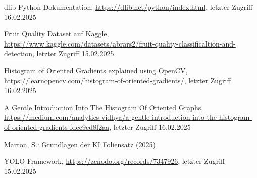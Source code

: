 \documentclass[runningheads]{llncs}
\begin{document}
%
%
%
% 
% 
%
\begin{thebibliography}{8}
dlib Python Dokumentation, \url{https://dlib.net/python/index.html}, letzter Zugriff 16.02.2025

Fruit Quality Dataset auf Kaggle, \url{https://www.kaggle.com/datasets/abrars2/fruit-quality-classificaltion-and-detection}, letzter Zugriff 15.02.2025

Histogram of Oriented Gradients explained using OpenCV, \url{https://learnopencv.com/histogram-of-oriented-gradients/}, letzter Zugriff 16.02.2025

A Gentle Introduction Into The Histogram Of Oriented Graphs, \url{https://medium.com/analytics-vidhya/a-gentle-introduction-into-the-histogram-of-oriented-gradients-fdee9ed8f2aa}, letzter Zugriff 16.02.2025

Marton, S.: Grundlagen der KI Foliensatz (2025)

YOLO Framework, \url{https://zenodo.org/records/7347926}, letzter Zugriff 15.02.2025




\end{thebibliography}
\end{document}
